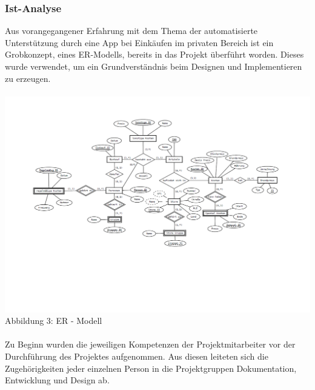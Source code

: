 \documentclass[12pt,a4paper]{article}
\begin{document}
\subsubsection{Ist-Analyse}
Aus vorangegangener Erfahrung mit dem Thema der automatisierte Unterstützung durch eine App bei Einkäufen im privaten Bereich ist ein Grobkonzept, eines ER-Modells, bereits in das Projekt überführt worden. Dieses wurde verwendet, um ein Grundverständnis beim Designen und Implementieren zu erzeugen. 
\\
\\
\hspace*{-20mm} 
\includegraphics[trim = 15mm 40mm 0mm 20mm, clip, scale=0.7]{ER-Modell.pdf}
\linebreak
\footnotesize Abbildung 3: ER - Modell
\\
\normalsize
\linebreak
\\
Zu Beginn wurden die jeweiligen Kompetenzen der Projektmitarbeiter vor der Durchführung des Projektes aufgenommen. 
Aus diesen leiteten sich die Zugehörigkeiten jeder einzelnen Person in die Projektgruppen Dokumentation, Entwicklung und Design ab. 
\\
\\
\end{document}
